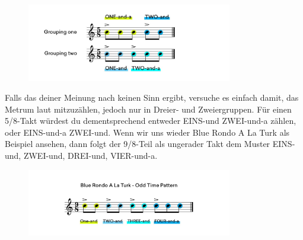 \begin{figure}[H]
    \centering
    \includegraphics[width=0.8\textwidth]{images/Rythm_body_10}
\end{figure}

Falls das deiner Meinung nach keinen Sinn ergibt, versuche es einfach damit, das Metrum laut mitzuzählen, jedoch nur in Dreier- und Zweiergruppen. Für einen  5/8-Takt würdest du dementsprechend entweder EINS-und ZWEI-und-a zählen, oder EINS-und-a ZWEI-und. Wenn wir uns wieder Blue Rondo A La Turk als Beispiel ansehen, dann folgt der 9/8-Teil als ungerader Takt dem Muster EINS-und, ZWEI-und, DREI-und, VIER-und-a.

\begin{figure}[H]
    \centering
    \includegraphics[width=0.8\textwidth]{images/Rythm_body_11}
\end{figure}